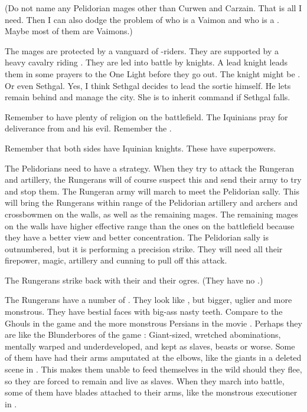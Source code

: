 (Do not name any Pelidorian mages other than Curwen and Carzain. That is all I need. Then I can also dodge the problem of who is a Vaimon and who is a \rethyax. Maybe most of them are Vaimons.)

The mages are protected by a vanguard of \grulcan-riders.
They are supported by a heavy cavalry riding \murocs. 
They are led into battle by knights.
A lead knight leads them in some prayers to the One Light before they go out.
The knight might be \Dornaer.
Or even Sethgal.
Yes, I think Sethgal decides to lead the sortie himself. 
He lets \Dornaer remain behind and manage the city.
She is to inherit command if Sethgal falls. 

Remember to have plenty of religion on the battlefield. 
The Iquinians pray for deliverance from  and his evil.
Remember the . 

Remember that both sides have Iquinian knights. 
These have superpowers.

The Pelidorians need to have a strategy.
When they try to attack the Rungeran \ishrah and artillery, the Rungerans will of course suspect this and send their army to try and stop them. 
The Rungeran army will march to meet the Pelidorian sally. 
This will bring the Rungerans within range of the Pelidorian artillery and archers and crossbowmen on the walls, as well as the remaining \ishrah mages. 
The remaining mages on the walls have higher effective range than the ones on the battlefield because they have a better view and better concentration. 
The Pelidorian sally is outnumbered, but it is performing a precision strike. 
They will need all their firepower, magic, artillery and cunning to pull off this attack. 

The Rungerans strike back with their \mezolisks and their ogres. 
(They have no \lothae.)

The Rungerans have a number of \nephil {}. 
They look like \humans, but bigger, uglier and more monstrous. 
They have bestial faces with big-ass nasty teeth. 
Compare to the Ghouls in the game \cite{VideoGame:WarcraftIII} and the more monstrous Persians in the movie \cite{Movie:300}. 
Perhaps they are like the Blunderbores of the game \cite{VideoGame:DiabloII}: 
Giant-sized, wretched abominations, mentally warped and underdeveloped, and kept as slaves, beasts or worse. 
Some of them have had their arms amputated at the elbows, like the giants in a deleted scene in \cite{Movie:300}. This makes them unable to feed themselves in the wild should they flee, so they are forced to remain and live as slaves. 
When they march into battle, some of them have blades attached to their arms, like the monstrous executioner in \cite{Movie:300}.

